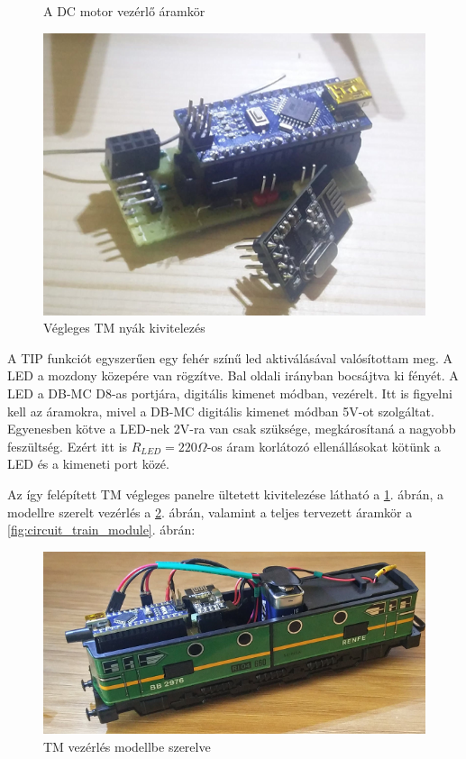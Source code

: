 \documentclass[a4paper,12pt]{article}
\begin{document}
\begin{enumerate}
\begin{figure}[htp]
\begin{minipage}{0.5\textwidth}
		    \caption[Motor vezérlés]{A DC motor vezérlő áramkör}
		    \label{fig:TMDCMC}
        \end{minipage}\hfill
        \begin{minipage}{0.45\textwidth}
            \centering
		    \includegraphics[width=0.9\linewidth]{images/TMboard.png}
	    	\caption[TM implementáció]{Végleges TM nyák kivitelezés}
	    	\label{fig:TMboard}
        \end{minipage}
    \end{figure}
	A TIP funkciót egyszerűen egy fehér színű led aktiválásával valósítottam meg.
	A LED a mozdony közepére van rögzítve. Bal oldali irányban bocsájtva ki fényét.
	A LED a DB-MC D8-as portjára, digitális kimenet módban, vezérelt. 
	Itt is figyelni kell az áramokra, mivel a DB-MC digitális kimenet módban 5V-ot szolgáltat.
	Egyenesben kötve a LED-nek 2V-ra van csak szüksége, megkárosítaná a nagyobb feszültség.
	Ezért itt is $R_{LED} = 220\Omega$-os áram korlátozó ellenállásokat kötünk a LED és a kimeneti port közé.
\end{enumerate}

Az így felépített TM végleges panelre ültetett kivitelezése látható a \ref{fig:TMboard}. ábrán, a modellre szerelt vezérlés a \ref{fig:TMmodell}. ábrán,  valamint a teljes tervezett áramkör a \ref{fig:circuit_train_module}. ábrán:


\begin{figure}[!htp]
	\includegraphics[width=\linewidth]{images/TMmodell.png}
    \caption[TM modellel]{TM vezérlés modellbe szerelve}
	\label{fig:TMmodell}
\end{figure}
\end{document}
